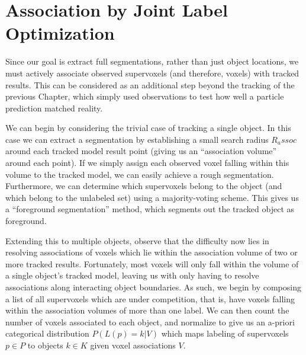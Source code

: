\section{Association by Joint Label Optimization}
Since our goal is extract full segmentations, rather than just object locations, we must actively associate observed supervoxels (and therefore, voxels) with tracked results. This can be considered as an additional step beyond the tracking of the previous Chapter, which simply used observations to test how well a particle prediction matched reality. 

We can begin by considering the trivial case of tracking a single object. In this case we can extract a segmentation by establishing a small search radius $R_assoc$ around each tracked model result point (giving us an ``association volume'' around each point). If we simply assign each observed voxel falling within this volume to the tracked model, we can easily achieve a rough segmentation. Furthermore, we can determine which supervoxels belong to the object (and which belong to the unlabeled set) using a majority-voting scheme. This gives us a ``foreground segmentation'' method, which segments out the tracked object as foreground. 


Extending this to multiple objects, observe that the difficulty now lies in resolving associations of voxels which lie within the association volume of two or more tracked results. Fortunately, most voxels will only fall within the volume of a single object's tracked model, leaving us with only having to resolve associations along interacting object boundaries. As such, we begin by composing a list of all supervoxels which are under competition, that is, have voxels falling within the association volumes of more than one label. We can then count the number of voxels associated to each object, and normalize to give us an a-priori categorical distribution ${P}(L(p) = k | V )$ which maps labeling of supervoxels $p \in P$  to objects $k \in K$ given voxel associations $V$.  

